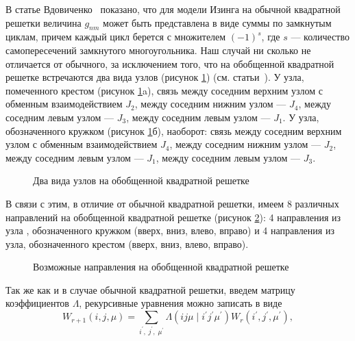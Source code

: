 В статье Вдовиченко~\cite{vdovichenko1965_1} показано, что для модели Изинга на обычной квадратной решетки величина $g_{nm}$ может быть представлена ​​в виде суммы по замкнутым циклам, причем каждый цикл берется с множителем $(-1)^s$, где $s$ --- количество самопересечений замкнутого многоугольника. Наш случай ни сколько не отличается от обычного, за исключением того, что на обобщенной квадратной решетке встречаются два вида узлов (рисунок \ref{point}) (см. статьи~\cite{vaks1966, chikyu1987}). У узла, помеченного крестом (рисунок \ref{point}a), связь между соседним верхним узлом с обменным взаимодействием $J_2$, между соседним нижним узлом --- $J_4$, между соседним левым узлом --- $J_3$, между соседним левым узлом --- $J_1$. У узла, обозначенного кружком (рисунок \ref{point}б), наоборот: связь между соседним верхним узлом с обменным взаимодействием $J_4$, между соседним нижним узлом --- $J_2$, между соседним левым узлом --- $J_1$, между соседним левым узлом --- $J_3$. 

 \begin{figure}[h]
 	\begin{minipage}[h]{0.4\linewidth}
 	\end{minipage}
 	\hfill
 	\begin{minipage}[h]{0.4\linewidth}
 	\end{minipage}
 	\caption{Два вида узлов на обобщенной квадратной решетке}
 	\label{point}
 \end{figure}

В связи с этим, в отличие от обычной квадратной решетки, имеем 8 различных направлений на обобщенной квадратной решетке (рисунок \ref{directionGen}): 4 направления из узла , обозначенного кружком (вверх, вниз, влево, вправо) и 4 направления из узла, обозначенного крестом (вверх, вниз, влево, вправо).

 \begin{figure}[h]
 	\caption{Возможные направления на обобщенной квадратной решетке}
 	\label{directionGen}
 \end{figure}

Так же как и в случае обычной квадратной решетки, введем матрицу коэффициентов $\Lambda$, рекурсивные уравнения можно записать в виде
\begin{equation}
W_{r+1}(i, j, \mu) = \sum_{i^{'},\; j^{'},\; \mu^{'}} \Lambda (ij\mu\; |\; i^{'}j^{'}\mu^{'}) W_{r} (i^{'}, j^{'}, \mu^{'}),
\end{equation}

